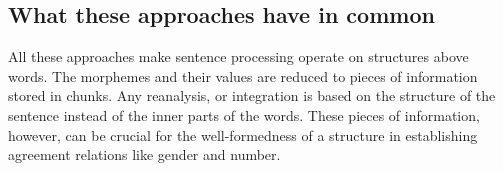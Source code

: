 \subsection{What these approaches have in common}

All these approaches make sentence processing operate on structures above words. The morphemes and their values are reduced to pieces of information stored in chunks. Any reanalysis, or integration is based on the structure of the sentence instead of the inner parts of the words. These pieces of information, however, can be crucial for the well-formedness of a structure in establishing agreement relations like gender and number.